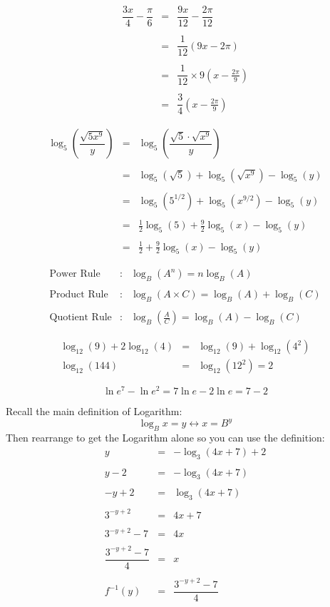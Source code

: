 \documentclass[addpoints, 24pt] {exam}
\begin{document}
$$\begin{array}{rcl}
\dfrac{3x}{4}-\dfrac{\pi}{6}&=&\dfrac{9x}{12}-\dfrac{2\pi}{12}\\\\
&=&\dfrac{1}{12}\left(9x-2\pi\right)\\\\
&=&\dfrac{1}{12}\times 9\left(x-\frac{2\pi}{9}\right)\\\\
&=&\dfrac{3}{4}\left(x-\frac{2\pi}{9}\right)
\end{array}$$

\[
\begin{array}{rcl}
\log_5\left(\dfrac{\sqrt{5x^9}}{y}\right) &=&\log_5\left(\dfrac{\sqrt{5}\cdot \sqrt{x^9}}{y}\right)\\\\&=&\log_5(\sqrt{5})+\log_5\left(\sqrt{x^9}\right)-\log_5(y)\\\\ &=& \log_5(5^{1/2}) + \log_5(x^{9/2}) - \log_5(y)\\\\
&=&\frac{1}{2}\log_5(5)+\frac{9}{2}\log_5(x)-\log_5(y)\\\\
&=&\frac{1}{2}+\frac{9}{2}\log_5(x)-\log_5(y)
\end{array}
\]

\[ 
\begin{array}{rcl} 
\text{Power Rule}&:&\log_B(A^n)=n\log_B(A)\\\\ 
\text{Product Rule}&:&\log_B(A\times C) = \log_B(A)+\log_B(C)\\\\
\text{Quotient Rule}&:&\log_B\left(\frac{A}{C}\right)=\log_B(A)-\log_B(C) 
\end{array}
\]

\[
\begin{array}{rcl}
\log_{12}(9)+2\log_{12}(4) &=&\log_{12}(9)+\log_{12}(4^2)\\
\log_{12}(144) &=& \log_{12}(12^2) = 2
\end{array}
\]

\[
\ln e^7-\ln e^2 = 7\ln e - 2\ln e = 7-2
\]

Recall the main definition of Logarithm:
\[
\log_B{x}=y\leftrightarrow x=B^y
\]
Then rearrange to get the Logarithm alone so you can use the definition:
\[
\begin{array}{rcl}
y&=&-\log_3(4x+7)+2\\\\
y-2&=&-\log_3(4x+7)\\\\
-y+2&=&\log_3(4x+7)\\\\
3^{-y+2}&=&4x+7\\\\
3^{-y+2}-7&=&4x\\\\
\dfrac{3^{-y+2}-7}{4}&=&x\\\\
f^{-1}(y)&=&\dfrac{3^{-y+2}-7}{4}
\end{array}
\]
\end{document}

